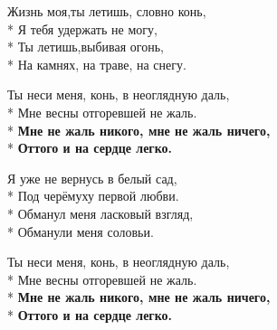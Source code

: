 \medskip

\begin{minipage}{\linewidth}
Жизнь моя,ты летишь, словно конь,\\*
Я тебя удержать не могу,\\*
Ты летишь,выбивая огонь,\\*
На камнях, на траве, на снегу.\\
\end{minipage}\par\medskip\nobreak

\medskip

\begin{minipage}{\linewidth}
\hspace*{1.5em}Ты неси меня, конь, в неоглядную даль,\\*
\hspace*{1.5em}Мне весны отгоревшей не жаль.\\*
\hspace*{1.5em}\textbf{Мне не жаль никого, мне не жаль ничего,}\\*
\hspace*{1.5em}\textbf{Оттого и на сердце легко.}\\
\end{minipage}\par\medskip\nobreak

\medskip

\begin{minipage}{\linewidth}
Я уже не вернусь в белый сад,\\*
Под черёмуху первой любви.\\*
Обманул меня ласковый взгляд,\\*
Обманули меня соловьи.\\
\end{minipage}\par\medskip\nobreak

\medskip

\begin{minipage}{\linewidth}
\hspace*{1.5em}Ты неси меня, конь, в неоглядную даль,\\*
\hspace*{1.5em}Мне весны отгоревшей не жаль.\\*
\hspace*{1.5em}\textbf{Мне не жаль никого, мне не жаль ничего,}\\*
\hspace*{1.5em}\textbf{Оттого и на сердце легко.}\\
\end{minipage}\par\medskip\nobreak

